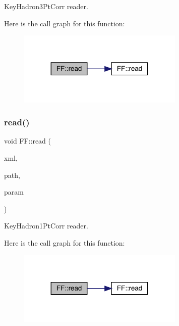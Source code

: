 Key\+Hadron3\+Pt\+Corr reader. 

Here is the call graph for this function\+:
\nopagebreak
\begin{figure}[H]
\begin{center}
\leavevmode
\includegraphics[width=224pt]{d5/da6/namespaceFF_a457d1bd921b678eadc34fb2dbfcbdb32_cgraph}
\end{center}
\end{figure}
\mbox{\label{namespaceFF_acb4db5dbe27937736b4f2cbed9694c56}} 
\subsubsection{\texorpdfstring{read()}{read()}\hspace{0.1cm}{\footnotesize\ttfamily [6/14]}}
{\footnotesize\ttfamily void F\+F\+::read (\begin{DoxyParamCaption}\item[{X\+M\+L\+Reader \&}]{xml,  }\item[{const std\+::string \&}]{path,  }\item[{\mbox{\hyperlink{structFF_1_1KeyHadron1PtCorr__t}{Key\+Hadron1\+Pt\+Corr\+\_\+t}} \&}]{param }\end{DoxyParamCaption})}



Key\+Hadron1\+Pt\+Corr reader. 

Here is the call graph for this function\+:
\nopagebreak
\begin{figure}[H]
\begin{center}
\leavevmode
\includegraphics[width=224pt]{d5/da6/namespaceFF_acb4db5dbe27937736b4f2cbed9694c56_cgraph}
\end{center}
\end{figure}
\mbox{\label{namespaceFF_ac879699f10e046e5a2059a2efcf1408b}} 
